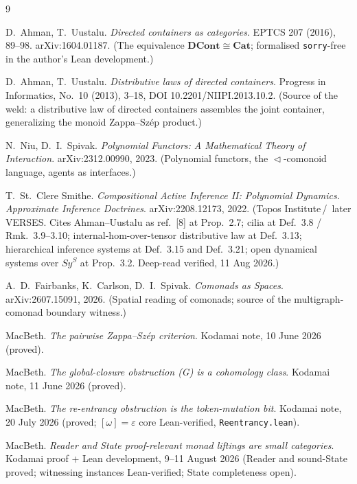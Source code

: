 \documentclass[11pt]{amsart}
\theoremstyle{plain}
\theoremstyle{definition}
\newcommand{\Cat}{\mathbf{Cat}}
\newcommand{\DCont}{\mathbf{DCont}}
\newcommand{\seq}{\vartriangleleft}
\newcommand{\iso}{\cong}
\begin{document}
\begin{thebibliography}{9}

 D.~Ahman, T.~Uustalu. \emph{Directed containers as categories}. EPTCS 207
(2016), 89--98. arXiv:1604.01187. \textup{(The equivalence $\DCont\iso\Cat$; formalised
\texttt{sorry}-free in the author's Lean development.)}

 D.~Ahman, T.~Uustalu. \emph{Distributive laws of directed containers}.
Progress in Informatics, No.~10 (2013), 3--18, DOI 10.2201/NIIPI.2013.10.2. \textup{(Source of the weld: a distributive law
of directed containers assembles the joint container, generalizing the monoid Zappa--Sz\'ep
product.)}

 N.~Niu, D.~I.~Spivak. \emph{Polynomial Functors: A Mathematical Theory of
Interaction}. arXiv:2312.00990, 2023. \textup{(Polynomial functors, the $\seq$-comonoid
language, agents as interfaces.)}

 T.~St.~Clere Smithe. \emph{Compositional Active Inference II: Polynomial
Dynamics. Approximate Inference Doctrines}. arXiv:2208.12173, 2022. \textup{(Topos Institute\,/\,
later VERSES. Cites Ahman--Uustalu as ref.~[8] at Prop.~2.7; cilia at Def.~3.8 / Rmk.~3.9--3.10;
internal-hom-over-tensor distributive law at Def.~3.13; hierarchical inference systems at
Def.~3.15 and Def.~3.21; open dynamical systems over $S y^S$ at Prop.~3.2. Deep-read verified,
11 Aug 2026.)}

 A.~D.~Fairbanks, K.~Carlson, D.~I.~Spivak. \emph{Comonads as Spaces}.
arXiv:2607.15091, 2026. \textup{(Spatial reading of comonads; source of the multigraph-comonad
boundary witness.)}

 MacBeth. \emph{The pairwise Zappa--Sz\'ep criterion}. Kodamai note, 10 June
2026 (proved).

 MacBeth. \emph{The global-closure obstruction \textnormal{(G)} is a cohomology
class}. Kodamai note, 11 June 2026 (proved).

 MacBeth. \emph{The re-entrancy obstruction is the token-mutation bit}. Kodamai
note, 20 July 2026 (proved; $[\omega]=\varepsilon$ core Lean-verified, \texttt{Reentrancy.lean}).

 MacBeth. \emph{Reader and State proof-relevant monad liftings are small
categories}. Kodamai proof + Lean development, 9--11 August 2026 (Reader and sound-State proved;
witnessing instances Lean-verified; State completeness open).

\end{thebibliography}
\end{document}
